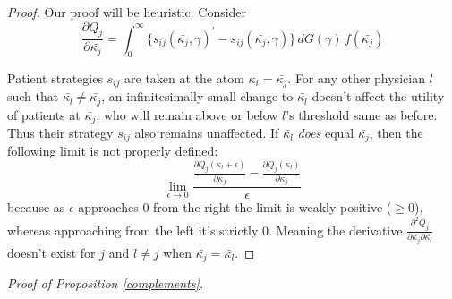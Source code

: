 \documentclass[../main.tex]{subfiles}
\begin{document}
\begin{proof}
Our proof will be heuristic. Consider
 \[
    \frac{\partial Q_{j}}{\partial\bar{\kappa_{j}}} = \int_{0}^{\infty} \{ {s_{ij}} (\bar{\kappa_j}, \gamma)^{\prime} - s_{ij} (\bar{\kappa_j}, \gamma)\} \,dG(\gamma) \,f(\bar{\kappa_j})
 \]

Patient strategies $s_{ij}$ are taken at the atom $\kappa_i = \bar{\kappa_j}$. For any other physician $l$ such that $\bar{\kappa_l} \neq \bar{\kappa_j}$, an infinitesimally small change to $\bar{\kappa_l}$ doesn't affect the utility of patients at $\bar{\kappa_j}$, who will remain above or below $l$'s threshold same as before. Thus their strategy $s_{ij}$ also remains unaffected. If $\bar{\kappa_l}$ \textit{does} equal $\bar{\kappa_j}$, then the following limit is not properly defined:
\[
    \lim_{\epsilon \rightarrow 0} \frac{ \frac{\partial Q_{j}(\kappa_l + \epsilon)}{\partial\bar{\kappa_{j}}} - \frac{\partial Q_{j}(\kappa_l ) }{\partial\bar{\kappa_{j}}}   }{\epsilon}
\]
because as $\epsilon$ approaches $0$ from the right the limit is weakly positive ($\geq 0$), whereas approaching from the left it's strictly $0$. Meaning the derivative $\frac{\partial^2 Q_{j}}{\partial\bar{\kappa_{j}} \partial\bar{\kappa_{l}}}$ doesn't exist for $j$ and $l \neq j$ when $\bar{\kappa_j}=\bar{\kappa_l}$.

\end{proof}

\textit{Proof of Proposition \ref{complements}.}
\end{document}
